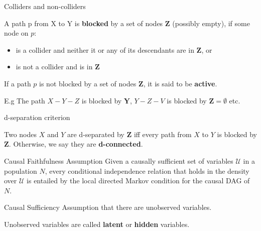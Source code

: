 \documentclass[english, compress, red]{beamer}
\begin{document}
\begin{frame}{Colliders and non-colliders}
	\begin{definition}
		A path p from X to Y is \textbf{blocked} by a set of nodes $\mathbf{Z}$ (possibly empty), if some node on $p$:
		\begin{itemize}
		\item is a collider and neither it or any of its descendants are in $\mathbf{Z}$, or
		\item is not a collider and is in $\mathbf{Z}$
		\end{itemize}
	\end{definition}
    \begin{definition}
	If a path $p$ is not blocked by a set of nodes $\mathbf{Z}$, it is said to be \textbf{active}.
	\end{definition}

E.g The path $X-Y-Z$ is blocked by $\mathbf{Y}$, $Y-Z-V$ is blocked by $\mathbf{Z}=\emptyset$ etc.
\end{frame}

\begin{frame}{d-separation criterion}
	\begin{definition}Two nodes $X$ and $Y$ are d-separated by $\mathbf{Z}$ iff every path from $X$ to $Y$ is blocked by $\mathbf{Z}$. Otherwise, we say they are \textbf{d-connected}.
	\end{definition}	
\end{frame}

\begin{frame}{Causal Faithfulness Assumption}
	Given a causally sufficient set of variables $\mathcal{U}$ in a population $N$, every conditional independence relation that holds in the density over $\mathcal{U}$ is entailed by the local directed Markov condition for the causal DAG of $N$.
\end{frame}

\begin{frame}{Causal Sufficiency}
	Assumption that there are unobserved variables.
	
	Unobserved variables are called \textbf{latent} or \textbf{hidden} variables.
	
\end{frame}
\end{document}
